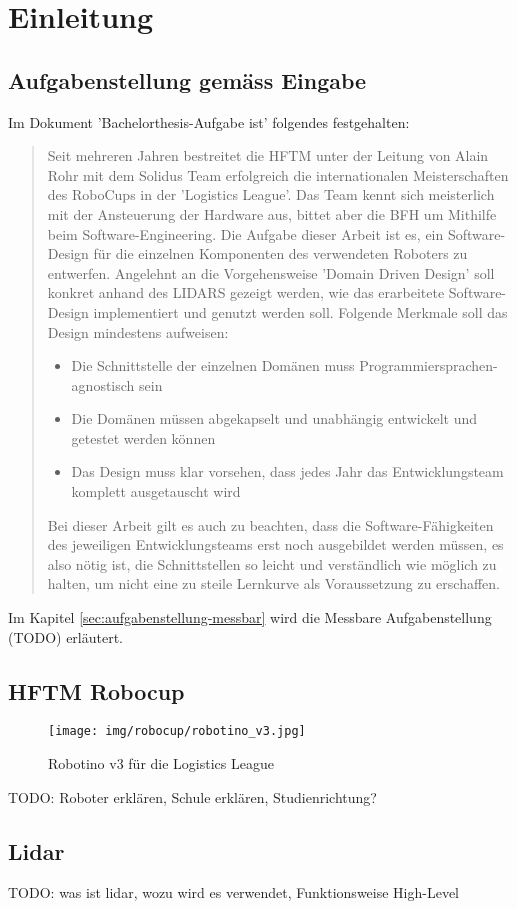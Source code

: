 \chapter{Einleitung}
\section{Aufgabenstellung gemäss Eingabe}
Im Dokument 'Bachelorthesis-Aufgabe ist' folgendes festgehalten:
\begin{quote}
Seit mehreren Jahren bestreitet die HFTM unter der Leitung von Alain Rohr mit dem Solidus Team erfolgreich die internationalen Meisterschaften des RoboCups in der 'Logistics League'.
Das Team kennt sich meisterlich mit der Ansteuerung der Hardware aus, bittet aber die BFH um Mithilfe beim Software-Engineering.
Die Aufgabe dieser Arbeit ist es, ein Software-Design für die einzelnen Komponenten des verwendeten Roboters zu entwerfen. Angelehnt an die Vorgehensweise 'Domain Driven Design' soll konkret anhand des LIDARS gezeigt werden, wie das erarbeitete Software-Design implementiert und genutzt werden soll. Folgende Merkmale soll das Design mindestens aufweisen:

\begin{itemize}
	\item Die Schnittstelle der einzelnen Domänen muss Programmiersprachen-agnostisch sein
	\item Die Domänen müssen abgekapselt und unabhängig entwickelt und getestet werden können
	\item Das Design muss klar vorsehen, dass jedes Jahr das Entwicklungsteam komplett ausgetauscht wird
\end{itemize}
Bei dieser Arbeit gilt es auch zu beachten, dass die Software-Fähigkeiten des jeweiligen Entwicklungsteams erst noch ausgebildet werden müssen, es also nötig ist, die Schnittstellen so leicht und verständlich wie möglich zu halten, um nicht eine zu steile Lernkurve als Voraussetzung zu erschaffen.
\end{quote}
Im Kapitel \ref{sec:aufgabenstellung-messbar} wird die Messbare Aufgabenstellung (TODO) erläutert.

\section{HFTM Robocup}
\begin{figure}[htbp]
	\centering
	\texttt{[image: img/robocup/robotino\_v3.jpg]}
	\caption{Robotino v3 für die Logistics League\cite{robotino}}  
\end{figure}

TODO:
Roboter erklären, Schule erklären, Studienrichtung?

\section{Lidar}
TODO:
was ist \acrshort{lidar}, wozu wird es verwendet, Funktionsweise High-Level




